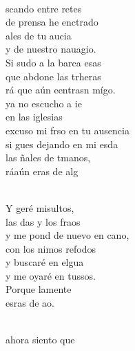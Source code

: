 \begin{cancion}%
	    \\
	scando entre retes\\
	de prensa he enctrado\\
	ales de tu aucia  \\
	y de nuestro nauagio.\\
	Si sudo a la barca esas\\
	que abdone las trheras\\
	rá que aún eentrasn mígo. \\
\jump
	 ya no escucho a ie \\
	en las iglesias\\
	excuso mi frso en tu ausencia\\
	si gues dejando en mi esda\\
	las ñales de tmanos,\\
	ráaún eras de  alg\\\jump\\
	\begin{chorus}%
	Y geré misultos,\\
	las das y los fraos\\
	y me pond de nuevo en cano, \\
	con los nimos refodos\\
	y  buscaré en elgua\\
	y me oyaré en tussos.\\
	Porque lamente   \\
	esras de  ao.\\
	\end{chorus}%
	\jump\\
	ahora siento que \\

\end{cancion}
